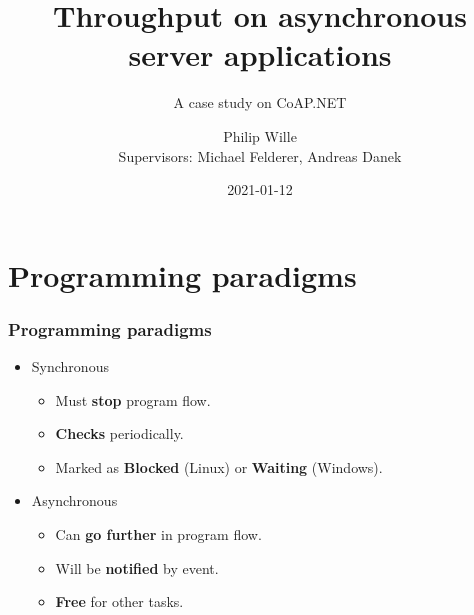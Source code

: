 \documentclass[11pt,t,usepdftitle=false,aspectratio=169,usenames,dvipsnames]{beamer}
\title[Initial presentation CoAP.NET]{Throughput on asynchronous server applications}
\subtitle{A case study on CoAP.NET}
\author{Philip Wille\\Supervisors: Michael Felderer, Andreas Danek}
\date{2021-01-12}
\begin{document}
    \maketitle
    \begin{frame}
        \vspace*{1cm plus 1fil}
        \tableofcontents
        \vspace*{0cm plus 1fil}
    \end{frame}
    
    \section{Programming paradigms}
    \begin{frame}
        \frametitle{Programming paradigms}
        \begin{itemize}
            \item<1-> Synchronous
            \begin{itemize}
                \item<3-> Must \textcolor{uibkblue}{\textbf{stop}} program flow.
                \item<5-> \textcolor{uibkblue}{\textbf{Checks}} periodically.
                \item<7-> Marked as \textcolor{uibkblue}{\textbf{Blocked}} (Linux) or \textcolor{uibkblue}{\textbf{Waiting}} (Windows).
            \end{itemize}
            \item<2-> Asynchronous
            \begin{itemize}
                \item<4-> Can \textcolor{uibkblue}{\textbf{go further}} in program flow.
                \item<6-> Will be \textcolor{uibkblue}{\textbf{notified}} by event.
                \item<8-> \textcolor{uibkblue}{\textbf{Free}} for other tasks.
            \end{itemize}
        \end{itemize}
    \end{frame}
\end{document}
